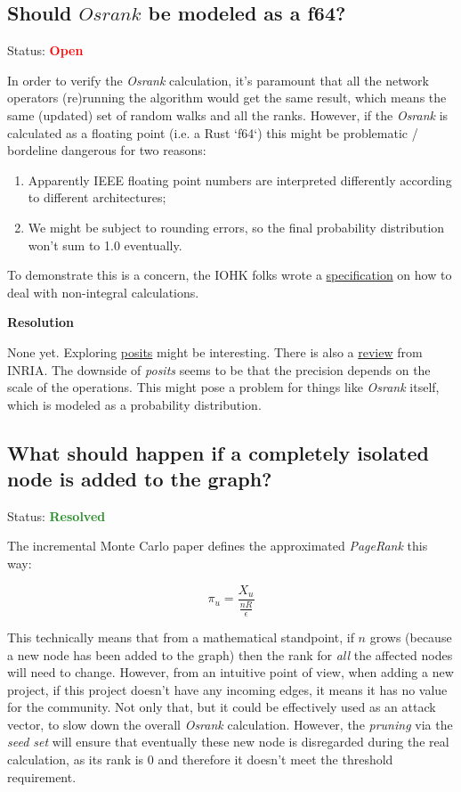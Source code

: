 \documentclass{article}
\begin{document}
\subsection{Should $Osrank$ be modeled as a f64? }

Status: \textcolor{red}{\textbf{Open}}

In order to verify the \textit{Osrank} calculation, it's paramount that all the
network operators (re)running the algorithm would get the same result, which means
the same (updated) set of random walks and all the ranks. However, if the
\textit{Osrank} is calculated as a floating point (i.e. a Rust `f64`) this might be
problematic / bordeline dangerous for two reasons:

\begin{enumerate}
\item Apparently IEEE floating point numbers are interpreted differently according
      to different architectures;
\item We might be subject to rounding errors, so the final probability distribution
      won't sum to 1.0 eventually.
\end{enumerate}

To demonstrate this is a concern, the IOHK folks wrote
a \href{https://hydra.iohk.io/build/902266/download/1/non-integer-calculations.pdf}{specification} on how to deal with non-integral calculations.

\textbf{Resolution}

None yet. Exploring \href{http://www.johngustafson.net/pdfs/BeatingFloatingPoint.pdf}{posits} might be interesting. There is also a \href{https://hal.inria.fr/hal-01959581v2/document}{review} from
INRIA. The downside of \textit{posits} seems to be that the
precision depends on the scale of the operations. This might pose
a problem for things like \textit{Osrank} itself, which is
modeled as a probability distribution.

\subsection{ What should happen if a completely isolated node is added to the graph? }

Status: \textcolor{ForestGreen}{\textbf{Resolved}}

The incremental Monte Carlo paper defines the approximated \textit{PageRank} this way:

$$
\pi_u = \frac{X_u}{\frac{nR}{\epsilon}}
$$

This technically means that from a mathematical standpoint, if $n$ grows (because a new
node has been added to the graph) then the rank for \textit{all} the affected nodes
will need to change. However, from an intuitive point of view, when adding a new project,
if this project doesn't have any incoming edges, it means it has no value for the
community. Not only that, but it could be effectively used as an attack vector, to slow
down the overall \textit{Osrank} calculation. However, the \textit{pruning} via the
\textit{seed set} will ensure that eventually these new node is disregarded during the
real calculation, as its rank is $0$ and therefore it doesn't meet the threshold
requirement.
\end{document}
